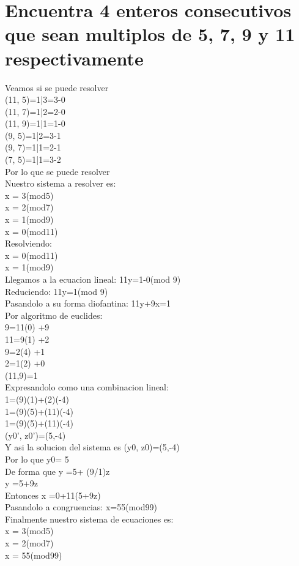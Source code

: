 \section{Encuentra 4 enteros consecutivos que sean multiplos de 5, 7, 9 y 11 respectivamente}
Veamos si se puede resolver\\
(11, 5)=1|3=3-0\\
(11, 7)=1|2=2-0\\
(11, 9)=1|1=1-0\\
(9, 5)=1|2=3-1\\
(9, 7)=1|1=2-1\\
(7, 5)=1|1=3-2\\
Por lo que se puede resolver\\


Nuestro sistema a resolver es:\\ 
x = 3(mod5)\\
x = 2(mod7)\\
x = 1(mod9)\\
x = 0(mod11)\\


Resolviendo: \\
x = 0(mod11)\\
x = 1(mod9)\\
Llegamos a la ecuacion lineal: 11y=1-0(mod 9)\\
Reduciendo: 11y=1(mod 9)\\
Pasandolo a su forma diofantina: 11y+9x=1\\
Por algoritmo de euclides: \\
9=11(0)  +9\\
11=9(1)  +2\\
9=2(4)  +1\\
2=1(2)  +0\\
(11,9)=1\\
Expresandolo como una combinacion lineal: \\
1=(9)(1)+(2)(-4)\\
1=(9)(5)+(11)(-4)\\
1=(9)(5)+(11)(-4)\\
(y0', z0')=(5,-4)\\
Y asi la solucion del sistema es (y0, z0)=(5,-4)\\
Por lo que y0= 5\\
De forma que y =5+ (9/1)z\\
y =5+9z\\
Entonces x =0+11(5+9z)\\
Pasandolo a congruencias: x=55(mod99)\\
Finalmente nuestro sistema de ecuaciones es:\\
x = 3(mod5)\\
x = 2(mod7)\\
x = 55(mod99)\\


